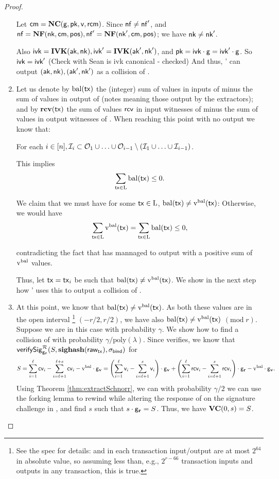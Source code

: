 \documentclass[11pt]{article}
\numberwithin{equation}{section} %
\numberwithin{figure}{section} %
\newcommand{\poly}{\ensuremath{\mathrm{poly}(\lambda)}\xspace}
\begin{document}
\begin{proof}
\begin{enumerate}
Let $\mathsf{cm}=\mathbf{NC}(\mathsf{g},\mathsf{pk},\mathsf{v},\mathsf{rcm})$.
Since $\mathsf{nf}\neq \mathsf{nf}'$,
and 
$\mathsf{nf} = \mathbf{NF}(\mathsf{nk},\mathsf{cm},\mathsf{pos}),\mathsf{nf}'= \mathbf{NF}(\mathsf{nk}',\mathsf{cm},\mathsf{pos})$;
we have  $\mathsf{nk} \neq\mathsf{nk}'$.

Also $\mathsf{ivk} = \mathbf{IVK}(\mathsf{ak},\mathsf{nk}), \mathsf{ivk}'=\mathbf{IVK}(\mathsf{ak}',\mathsf{nk}')$,
and $\mathsf{pk}=\mathsf{ivk}\cdot \mathsf{g} = \mathsf{ivk}'\cdot \mathsf{g}$.
So $\mathsf{ivk}=\mathsf{ivk}'$ (Check with Sean is ivk canonical - checked)
And thus, \adv' can output $(\mathsf{ak},\mathsf{nk}),(\mathsf{ak}',\mathsf{nk}')$ as a collision of \IVK.


\item Let us denote by $\mathrm{bal}(\mathsf{tx})$ the (integer) sum of values in inputs of \tx minus the sum of values in output of \tx (notes meaning those output by the extractors);
and by $\mathrm{\mathbf{rcv}}(\mathsf{tx})$ the sum of values $\mathsf{rcv}$ in input witnesses of \tx minus the sum of values \rcv in output witnesses of \tx.
When reaching this point with no output we know that:

For each $i\in [n], {\mathcal{I}}_i \subset {\mathcal{O}}_1\cup\ldots\cup{\mathcal{O}}_{i-1}\setminus({\mathcal{I}}_1\cup\ldots\cup{\mathcal{I}}_{i-1})$.

This implies 
\[\sum_{\mathsf{tx}\in\mathrm{L}} \mathrm{bal}(\mathsf{tx}) \leq 0.\]

We claim that we must have for some $\mathsf{tx}\in\mathrm{L}$, $\mathrm{bal}(\mathsf{tx})\neq \mathrm{v^{bal}}(\mathsf{tx})$:
Otherwise, we would have
\[\sum_{\mathsf{tx}\in \mathrm{L}} \mathrm{v^{bal}}(\mathsf{tx}) = \sum_{\mathsf{tx}\in\mathrm{L}} \mathrm{bal}(\mathsf{tx}) \leq 0,\]

contradicting the fact that \adv has mannaged to output \ledger with a positive sum of $\mathrm{v^{bal}}$ values.

Thus, let $\mathsf{tx}=\mathsf{tx}_i$ be such that $\mathrm{bal}(\mathsf{tx})\neq\mathrm{v^{bal}}(\mathsf{tx})$. We show in the next step how \adv' uses this to output a collision of \valcom.

\item At this point, we know that $\mathrm{bal}(\mathsf{tx}) \neq \mathrm{v^{bal}}(\mathsf{tx})$. As both these values are in the open interval \footnote{See 
the spec for details: \vbal and \val in each transaction input/output are at most $2^{64}$ in absolute value, so assuming 
less than, e.g., $2^{r-66}$ transaction inputs and outputs in any transaction, this is true.} $(-r/2,r/2)$, we have also $\mathrm{bal}(\mathsf{tx})\neq \mathrm{v^{bal}}(\mathsf{tx})$ $(\mathrm{mod}\;  r)$.
Suppose we are in this case with probability $\gamma$. We show how to find a collision of \valcom with probability
$\gamma/\poly$. Since \tx verifies, we know that
$\mathsf{verifySig}^{\mathcal R}_{\mathsf{g}_\mathbf{r}}(S,\mathbf{sighash}(\mathsf{raw_{tx}}),\sigma_{\mathsf{bind}})$ for 
\[S=\sum_{i=1}^\ell \mathsf{cv}_i - \sum_{i=\ell+1}^{\ell+s}\mathsf{cv}_i-\mathrm{v^{bal}}\cdot \mathsf{g}_{\mathbf{v}}= \left(\sum_{i=1}^{\ell} \mathsf{v}_i-\sum_{i=\ell+1}^{s} \mathsf{v}_i\right)\cdot \mathsf{g}_{\mathbf{v}} + \left(\sum_{i=1}^{\ell} \mathsf{rcv}_i-\sum_{i=\ell+1}^{s} \mathsf{rcv}_i\right)\cdot \mathsf{g}_\mathbf{r}  - \mathrm{v^{bal}}\cdot \mathsf{g}_{\mathbf{v}}.\]
Using Theorem \ref{thm:extractSchnorr}, we can
with probability $\gamma/2$ we can use the forking lemma to rewind \adv while altering the response of \RO on the signature challenge in \sigval, and find $s$ such that $s\cdot \mathsf{g}_\mathbf{r} = S$.
Thus, we have $\mathbf{VC}(0,s) = S$.


\end{enumerate}
\end{proof}
\end{document}
